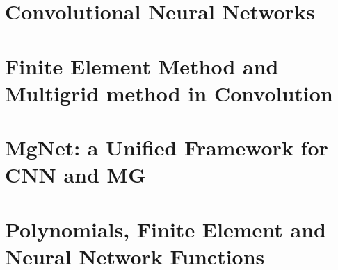 \chapter{Convolutional Neural Networks}










\chapter{Finite Element Method and Multigrid method in Convolution}










\chapter{MgNet: a Unified Framework for CNN and MG}







\chapter{ Polynomials, Finite Element and Neural Network Functions}













%








%
%
%


